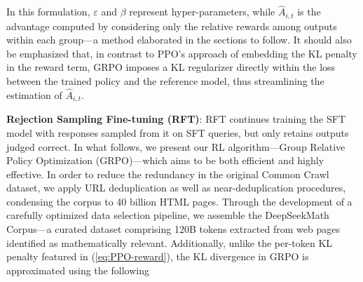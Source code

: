 In this formulation, $\varepsilon$ and $\beta$ represent hyper-parameters, while $\hat{A}_{i,t}$ is the advantage computed by considering only the relative rewards among outputs within each group—a method elaborated in the sections to follow. It should also be emphasized that, in contrast to PPO’s approach of embedding the KL penalty in the reward term, GRPO imposes a KL regularizer directly within the loss between the trained policy and the reference model, thus streamlining the estimation of $\hat{A}_{i,t}$. \item \textbf{Rejection Sampling Fine-tuning (RFT)}: RFT continues training the SFT model with responses sampled from it on SFT queries, but only retains outputs judged correct. In what follows, we present our RL algorithm—Group Relative Policy Optimization (GRPO)—which aims to be both efficient and highly effective. In order to reduce the redundancy in the original Common Crawl dataset, we apply URL deduplication as well as near-deduplication procedures, condensing the corpus to 40 billion HTML pages. Through the development of a carefully optimized data selection pipeline, we assemble the DeepSeekMath Corpus—a curated dataset comprising 120B tokens extracted from web pages identified as mathematically relevant. Additionally, unlike the per-token KL penalty featured in (\ref{eq:PPO-reward}), the KL divergence in GRPO is approximated using the following

